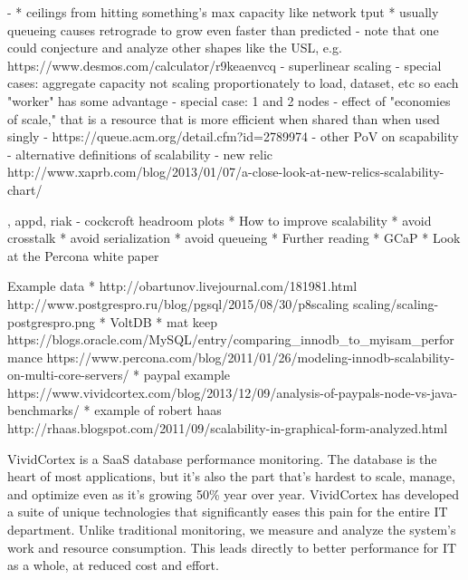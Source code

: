 \documentclass{vivid_layout_pdf}
\begin{document}
  - 
      * ceilings from hitting something’s max capacity like network tput
		    * usually queueing causes retrograde to grow even faster than
			 predicted
	- note that one could conjecture and analyze other shapes like the USL, e.g.
	https://www.desmos.com/calculator/r9keaenvcq
- superlinear scaling
	- special cases: aggregate capacity not scaling proportionately to load,
	dataset, etc so each "worker" has some advantage
	- special case: 1 and 2 nodes
	- effect of "economies of scale," that is a resource that is more efficient
	when shared than when used singly
	- https://queue.acm.org/detail.cfm?id=2789974
- other PoV on scapability
	- alternative definitions of scalability - new relic
	 http://www.xaprb.com/blog/2013/01/07/a-close-look-at-new-relics-scalability-chart/

	, appd, riak
	- cockcroft headroom plots
* How to improve scalability
    * avoid crosstalk
	     * avoid serialization
		      * avoid queueing
* Further reading
				    * GCaP
					     * Look at the Percona white paper


Example data
* http://obartunov.livejournal.com/181981.html
  http://www.postgrespro.ru/blog/pgsql/2015/08/30/p8scaling
  scaling/scaling-postgrespro.png
* VoltDB
* mat keep
https://blogs.oracle.com/MySQL/entry/comparing_innodb_to_myisam_performance
https://www.percona.com/blog/2011/01/26/modeling-innodb-scalability-on-multi-core-servers/
* paypal example
https://www.vividcortex.com/blog/2013/12/09/analysis-of-paypals-node-vs-java-benchmarks/
* example of robert haas
http://rhaas.blogspot.com/2011/09/scalability-in-graphical-form-analyzed.html


\newpage

\begin{about}	%
VividCortex is a SaaS database performance monitoring. The database is the heart of most applications, but it's also the part that's hardest to scale, manage, and optimize even as it's growing 50\% year over year. VividCortex has developed a suite of unique technologies that significantly eases this pain for the entire IT department. Unlike traditional monitoring, we measure
and analyze the system's work and resource consumption. This leads directly to better performance for IT as a whole, at reduced cost and effort.
\end{about}
\makeresources	%
\end{document}
